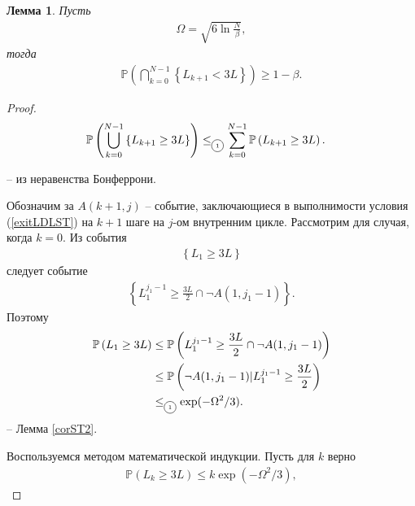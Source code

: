 \documentclass[11pt,a4]{article}
\newtheorem{lemma}{Лемма}
\newcommand*\circled[1]{\tikz[baseline=(char.base)]{
		\node[shape=circle,draw,inner sep=2pt] (char) {#1};}}
\begin{document}
\begin{lemma}
\leavevmode
\label{remark2ST}
Пусть \begin{gather*}\Omega = \sqrt{6\ln{\frac{N}{\beta}}},\end{gather*} тогда
 \begin{align*}
 \mathbb{P}\left(\bigcap_{k=0}^{N-1}\left\{L_{k+1} < 3L\right\}\right) \geq 1 - \beta.
 \end{align*}

\end{lemma}
\begin{proof}

\begin{align*}
\mathbb{P}\left(\bigcup_{k=0}^{N-1}\left\{L_{k+1} \geq 3L\right\}\right) &\leq_{{\tiny \circled{1}}} \sum_{k = 0}^{N - 1}\mathbb{P}\left(L_{k+1} \geq 3L\right).
\end{align*}

{\small \circled{1}} -- из неравенства Бонферрони.

Обозначим за $A(k+1, j)$ -- событие, заключающиеся в выполнимости условия (\ref{exitLDLST}) на $k+1$ шаге на $j$-ом внутренним цикле. Рассмотрим для случая, когда $k = 0$. Из события \begin{align*}\left\{L_{1} \geq 3L\right\}\end{align*} следует событие \begin{align*}\left\{L_1^{j_1 - 1} \geq \frac{3L}{2} \cap \neg A(1,j_1 - 1)\right\}.\end{align*} 
Поэтому
\begin{align*}
\mathbb{P}\left(L_{1} \geq 3L\right)
&\leq \mathbb{P}\left(L_1^{j_1 - 1} \geq \frac{3L}{2} \cap \neg A(1,j_1 - 1)\right)\\
&\leq \mathbb{P}\left(\neg A(1,j_1 - 1)|L_1^{j_1 - 1} \geq \frac{3L}{2}\right)\\
&\leq_{{\tiny \circled{1}}} \exp(-\Omega^2/3).
\end{align*}
{\small \circled{1}} -- Лемма \ref{corST2}.

Воспользуемся методом математической индукции. Пусть для $k$ верно
\begin{align*}
\mathbb{P}\left(L_{k} \geq 3L\right) \leq k\exp(-\Omega^2/3),
\end{align*}


\end{proof}
\end{document}
